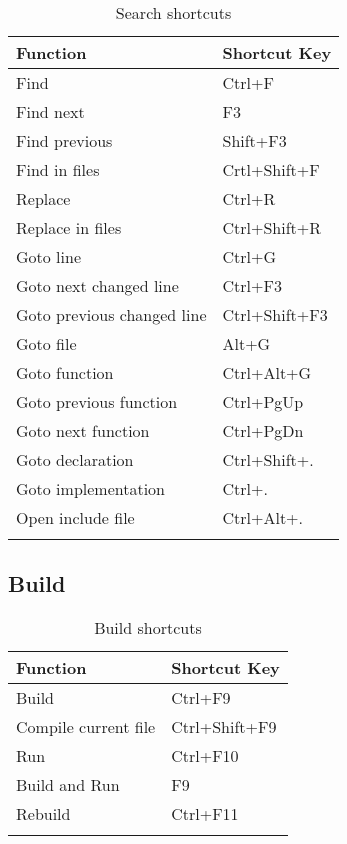 {\small 
\begin{longtable}{|l|l|}\hline
\textbf{Function}		    &   \textbf{Shortcut Key}   \\ \hline
\endhead   %
Find 		                &	Ctrl+F                  \\ \hline
Find next 	                &	F3                      \\ \hline
Find previous 	            &	Shift+F3                \\ \hline
Find in files 	            &	Crtl+Shift+F            \\ \hline
Replace 	                &	Ctrl+R                  \\ \hline
Replace in files            &	Ctrl+Shift+R            \\ \hline
Goto line 	                &	Ctrl+G                  \\ \hline
Goto next changed line 	    &	Ctrl+F3                 \\ \hline
Goto previous changed line 	&	Ctrl+Shift+F3           \\ \hline
Goto file 	                &	Alt+G                   \\ \hline
Goto function 	            &	Ctrl+Alt+G              \\ \hline
Goto previous function      &   Ctrl+PgUp               \\ \hline
Goto next function          &   Ctrl+PgDn               \\ \hline
Goto declaration            &   Ctrl+Shift+.            \\ \hline
Goto implementation         &   Ctrl+.                  \\ \hline
Open include file           &   Ctrl+Alt+.              \\ \hline
\caption{Search shortcuts}
\end{longtable}
}

\subsection{Build}

{\small 
\begin{longtable}{|l|l|}\hline
\textbf{Function}		&   \textbf{Shortcut Key}   \\ \hline
\endhead   %
Build 		            &	Ctrl+F9                 \\ \hline
Compile current file	&	Ctrl+Shift+F9           \\ \hline
Run		                &	Ctrl+F10                \\ \hline
Build and Run 	        &	F9                      \\ \hline
Rebuild 	            &	Ctrl+F11                \\ \hline
\caption{Build shortcuts}
\end{longtable}
}


